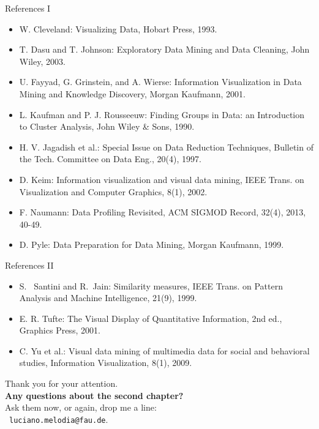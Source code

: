 \documentclass[aspectratio=169,t]{beamer}
\begin{document}
  { 
    \begin{frame}{References I}
        \begin{itemize}
          \item W. Cleveland: Visualizing Data, Hobart Press, 1993.
          \item T. Dasu and T. Johnson: Exploratory Data Mining and Data Cleaning, John Wiley, 2003.
          \item U. Fayyad, G. Grinstein, and A. Wierse: Information Visualization in Data Mining and Knowledge Discovery, Morgan Kaufmann, 2001.
          \item L. Kaufman and P. J. Rousseeuw: Finding Groups in Data: an Introduction to Cluster Analysis, John Wiley \& Sons, 1990.
          \item H. V. Jagadish et al.: Special Issue on Data Reduction Techniques, Bulletin of the Tech. Committee on Data Eng., 20(4), 1997.
          \item D. Keim: Information visualization and visual data mining, IEEE Trans. on Visualization and Computer Graphics, 8(1), 2002.
          \item F. Naumann: Data Profiling Revisited, ACM SIGMOD Record, 32(4), 2013, 40-49.
          \item D. Pyle: Data Preparation for Data Mining, Morgan Kaufmann, 1999.
        \end{itemize}
    \end{frame}
  }

  { 
    \begin{frame}{References II}
        \begin{itemize}
          \item S.  Santini and R. Jain: Similarity measures, IEEE Trans. on Pattern Analysis and Machine Intelligence, 21(9), 1999.
          \item E. R. Tufte: The Visual Display of Quantitative Information, 2nd ed., Graphics Press, 2001.
          \item C. Yu et al.: Visual data mining of multimedia data for social and behavioral studies, Information Visualization, 8(1), 2009.
        \end{itemize}
    \end{frame}
  }

  { %
    \begin{frame}[c]
      \begin{center}
        Thank you for your attention.\\
        {\bf Any questions about the second chapter?}\\[0.5cm]
        Ask them now, or again, drop me a line: \\ 
        \faSendO \ \texttt{luciano.melodia@fau.de}.
      \end{center}
    \end{frame}
  }
\end{document}
